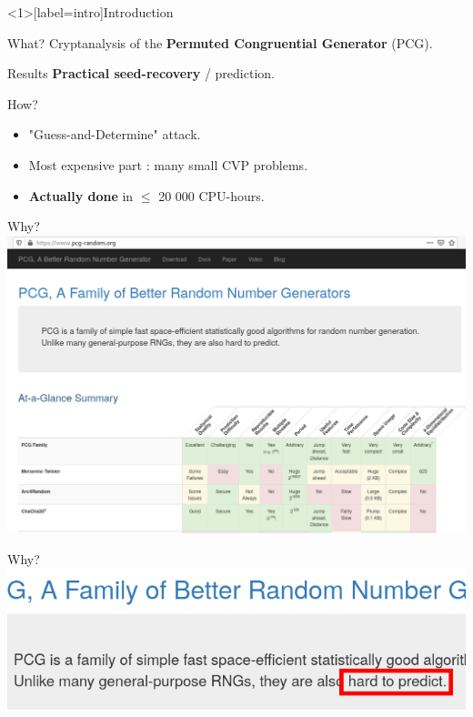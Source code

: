 \begin{frame}<1>[label=intro]{Introduction}
    
    \begin{exampleblock}{What?}
        Cryptanalysis of the \textbf{Permuted Congruential Generator} (PCG).
    \end{exampleblock}
    
    \medskip\pause
    
    \begin{alertblock}{Results}
      \textbf{Practical seed-recovery} / prediction.
    \end{alertblock}
    
    \begin{block}{How?}
    \begin{itemize}
        \item "Guess-and-Determine" attack.
        \item Most expensive part : many small CVP problems.
        \item \textbf{Actually done} in $\leq$ 20 000 CPU-hours.
    \end{itemize}  
    \end{block}
\end{frame}

\begin{frame}{Why?}
    \centering
    \includegraphics[width=\textwidth]{pictures/website.png}
\end{frame}

\begin{frame}{Why?}
    \centering
    \includegraphics[width=\textwidth]{pictures/hard.png}
    \vfill
  \end{frame}

